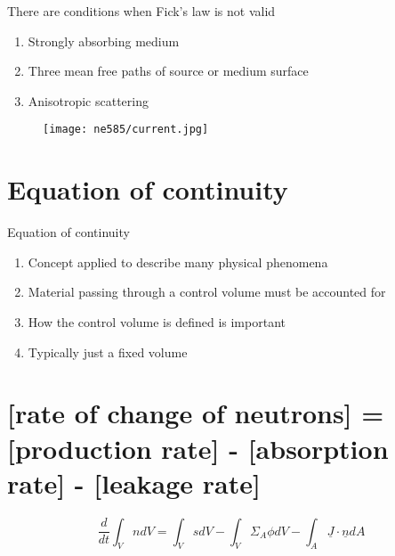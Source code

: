 \documentclass[aspectratio=1610,pdftex,dvipsnames,compress,xcolor={dvipsnames}]{beamer}
\begin{document}
\begin{frame}{There are conditions when Fick's law is not valid}
    \begin{enumerate}[series=outerlist,topsep=0pt,itemsep=21pt,leftmargin=*,label=(\arabic*)]
        \item[]Strongly absorbing medium
        \item[]Three mean free paths of source or medium surface
        \item[]Anisotropic scattering
    \end{enumerate}
\end{frame}


\begin{frame}{}
    \begin{figure}
        \centering
        \texttt{[image: ne585/current.jpg]}
    \end{figure}
\end{frame}


\section{Equation of continuity}


\addtocounter{framenumber}{-1} 
\begin{frame}{Equation of continuity}
    \begin{enumerate}[series=outerlist,topsep=0pt,itemsep=21pt,leftmargin=*,label=(\arabic*)]
        \item[]Concept applied to describe many physical phenomena
        \item[]Material passing through a control volume must be accounted for
        \item[]How the control volume is defined is important
        \item[]Typically just a fixed volume
    \end{enumerate}
\end{frame}




\section{[rate of change of neutrons] = [production rate] - [absorption rate] - [leakage rate]}


\begin{frame}[plain]{}
    \LARGE
    \begin{equation*}
        \frac{d}{dt} \int_V n dV =
        \int_V s dV - \int_V \Sigma_A \phi dV - \int_A \underline{J} \cdot \underline{n} dA
    \end{equation*}
\end{frame}
\end{document}
